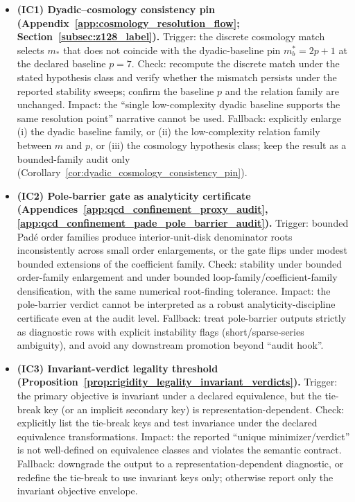 \begin{itemize}
\item \textbf{(IC1) Dyadic--cosmology consistency pin (Appendix~\ref{app:cosmology_resolution_flow}; Section~\ref{subsec:z128_label}).}
  Trigger: the discrete cosmology match selects $m_\ast$ that does not coincide with the dyadic-baseline pin $m_b^\ast=2p+1$ at the declared baseline $p=7$.
  Check: recompute the discrete match under the stated hypothesis class and verify whether the mismatch persists under the reported stability sweeps; confirm the baseline $p$ and the relation family are unchanged.
  Impact: the ``single low-complexity dyadic baseline supports the same resolution point'' narrative cannot be used.
  Fallback: explicitly enlarge (i) the dyadic baseline family, or (ii) the low-complexity relation family between $m$ and $p$, or (iii) the cosmology hypothesis class; keep the result as a bounded-family audit only (Corollary~\ref{cor:dyadic_cosmology_consistency_pin}).

\item \textbf{(IC2) Pole-barrier gate as analyticity certificate (Appendices~\ref{app:qcd_confinement_proxy_audit}, \ref{app:qcd_confinement_pade_pole_barrier_audit}).}
  Trigger: bounded Pad\'e order families produce interior-unit-disk denominator roots inconsistently across small order enlargements, or the gate flips under modest bounded extensions of the coefficient family.
  Check: stability under bounded order-family enlargement and under bounded loop-family/coefficient-family densification, with the same numerical root-finding tolerance.
  Impact: the pole-barrier verdict cannot be interpreted as a robust analyticity-discipline certificate even at the audit level.
  Fallback: treat pole-barrier outputs strictly as diagnostic rows with explicit instability flags (short/sparse-series ambiguity), and avoid any downstream promotion beyond ``audit hook''.

\item \textbf{(IC3) Invariant-verdict legality threshold (Proposition~\ref{prop:rigidity_legality_invariant_verdicts}).}
  Trigger: the primary objective is invariant under a declared equivalence, but the tie-break key (or an implicit secondary key) is representation-dependent.
  Check: explicitly list the tie-break keys and test invariance under the declared equivalence transformations.
  Impact: the reported ``unique minimizer/verdict'' is not well-defined on equivalence classes and violates the semantic contract.
  Fallback: downgrade the output to a representation-dependent diagnostic, or redefine the tie-break to use invariant keys only; otherwise report only the invariant objective envelope.


\end{itemize}
